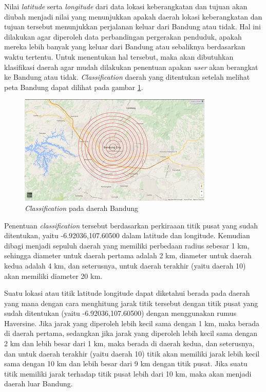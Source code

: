 Nilai \textsl{latitude} serta \textsl{longitude} dari data lokasi keberangkatan dan tujuan akan diubah menjadi nilai yang menunjukkan apakah daerah lokasi keberangkatan dan tujuan tersebut menunjukkan perjalanan keluar dari Bandung atau tidak. Hal ini dilakukan agar diperoleh data perbandingan pergerakan penduduk, apakah mereka lebih banyak yang keluar dari Bandung atau sebaliknya berdasarkan waktu tertentu. Untuk menentukan hal tersebut, maka akan dibutuhkan klasifikasi daerah agar mudah dilakukan penentuan apakan \textsl{user} akan berangkat ke Bandung atau tidak. \textsl{Classification} daerah yang ditentukan setelah melihat peta Bandung dapat dilihat pada gambar \ref{fig:classificationMap}.

\begin{figure}
\centering
\includegraphics[scale=1]{Gambar/classificationmap.jpg}
\caption[\textsl{Classification} pada daerah Bandung]{\textsl{Classification} pada daerah Bandung}
\label{fig:classificationMap} 
\end{figure}

Penentuan \textsl{classification} tersebut berdasarkan perkiraaan titik pusat yang sudah ditentukan, yaitu -6.92036,107.60500 dalam latitude dan longitude. Kemudian dibagi menjadi sepuluh daerah yang memiliki perbedaan radius sebesar 1 km, sehingga diameter untuk daerah pertama adalah 2 km, diameter untuk daerah kedua adalah 4 km, dan seterusnya, untuk daerah terakhir (yaitu daerah 10) akan memiliki diameter 20 km.

Suatu lokasi atau titik latitude longitude dapat diketahui berada pada daerah yang mana dengan cara menghitung jarak titik tersebut dengan titik pusat yang sudah ditentukan (yaitu -6.92036,107.60500) dengan menggunakan rumus Haversine. Jika jarak yang diperoleh lebih kecil sama dengan 1 km, maka berada di daerah pertama, sedangkan jika jarak yang diperoleh lebih kecil sama dengan 2 km dan lebih besar dari 1 km, maka berada di daerah kedua, dan seterusnya, dan untuk daerah terakhir (yaitu daerah 10) titik akan memiliki jarak lebih kecil sama dengan 10 km dan lebih besar dari 9 km dengan titik pusat. Jika suatu titik memiliki jarak terhadap titik pusat lebih dari 10 km, maka akan menjadi daerah luar Bandung.

